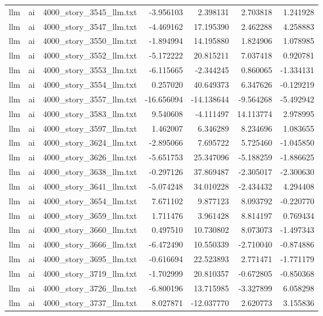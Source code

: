 \begin{longtable}{lllrrrr}
llm & ai & 4000\_story\_3545\_llm.txt & -3.956103 & 2.398131 & 2.703818 & 1.241928 \\
llm & ai & 4000\_story\_3547\_llm.txt & -4.469162 & 17.195390 & 2.462288 & 4.258883 \\
llm & ai & 4000\_story\_3550\_llm.txt & -1.894994 & 14.195880 & 1.824906 & 1.078985 \\
llm & ai & 4000\_story\_3552\_llm.txt & -5.172222 & 20.815211 & 7.037418 & 0.920781 \\
llm & ai & 4000\_story\_3553\_llm.txt & -6.115665 & -2.344245 & 0.860065 & -1.334131 \\
llm & ai & 4000\_story\_3554\_llm.txt & 0.257020 & 40.649373 & 6.347626 & -0.129219 \\
llm & ai & 4000\_story\_3557\_llm.txt & -16.656094 & -14.138644 & -9.564268 & -5.492942 \\
llm & ai & 4000\_story\_3583\_llm.txt & 9.540608 & -4.111497 & 14.113774 & 2.978995 \\
llm & ai & 4000\_story\_3597\_llm.txt & 1.462007 & 6.346289 & 8.234696 & 1.083655 \\
llm & ai & 4000\_story\_3624\_llm.txt & -2.895066 & 7.695722 & 5.725460 & -1.045850 \\
llm & ai & 4000\_story\_3626\_llm.txt & -5.651753 & 25.347096 & -5.188259 & -1.886625 \\
llm & ai & 4000\_story\_3638\_llm.txt & -0.297126 & 37.869487 & -2.305017 & -2.300630 \\
llm & ai & 4000\_story\_3641\_llm.txt & -5.074248 & 34.010228 & -2.434432 & 4.294408 \\
llm & ai & 4000\_story\_3654\_llm.txt & 7.671102 & 9.877123 & 8.093792 & -0.220770 \\
llm & ai & 4000\_story\_3659\_llm.txt & 1.711476 & 3.961428 & 8.814197 & 0.769434 \\
llm & ai & 4000\_story\_3660\_llm.txt & 0.497510 & 10.730802 & 8.073073 & -1.497343 \\
llm & ai & 4000\_story\_3666\_llm.txt & -6.472490 & 10.550339 & -2.710040 & -0.874886 \\
llm & ai & 4000\_story\_3695\_llm.txt & -0.616694 & 22.523893 & 2.771471 & -1.771179 \\
llm & ai & 4000\_story\_3719\_llm.txt & -1.702999 & 20.810357 & -0.672805 & -0.850368 \\
llm & ai & 4000\_story\_3726\_llm.txt & -6.800196 & 13.715985 & -3.327899 & 6.058298 \\
llm & ai & 4000\_story\_3737\_llm.txt & 8.027871 & -12.037770 & 2.620773 & 3.155836 \\

\end{longtable}
